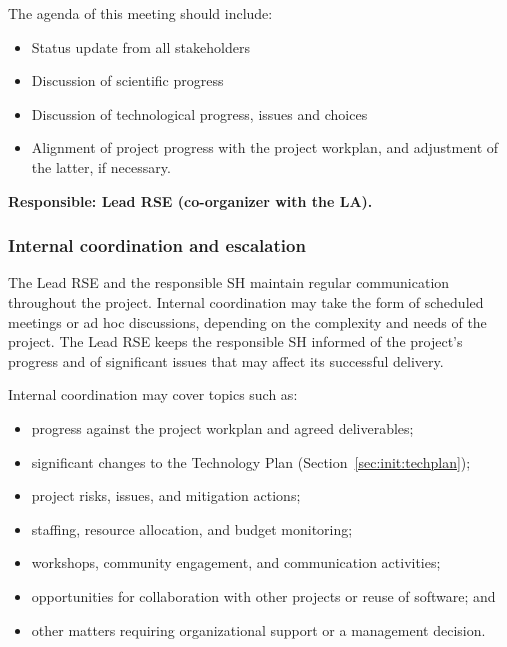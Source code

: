 The agenda of this meeting should include:
\vspace{-0.2cm}
\begin{itemize}
\item Status update from all stakeholders
\item Discussion of scientific progress
\item Discussion of technological progress, issues and choices
\item Alignment of project progress with the project workplan, and adjustment of the latter, if necessary.
\end{itemize}
\vspace{-0.2cm}

\textbf{Responsible: Lead RSE (co-organizer with the LA).}

\subsubsection{Internal coordination and escalation}
\label{sec:exec:internalcoord}
The Lead RSE and the responsible SH maintain regular communication throughout the project. Internal coordination may 
take the form of scheduled meetings or ad hoc discussions, depending on the complexity and needs of the project. The 
Lead RSE keeps the responsible SH informed of the project’s progress and of significant issues that may affect its 
successful delivery.

Internal coordination may cover topics such as:
\vspace{-0.2cm}
\begin{itemize}
\item progress against the project workplan and agreed deliverables;
\item significant changes to the Technology Plan (Section~\ref{sec:init:techplan});
\item project risks, issues, and mitigation actions;
\item staffing, resource allocation, and budget monitoring;
\item workshops, community engagement, and communication activities;
\item opportunities for collaboration with other projects or reuse of software; and
\item other matters requiring organizational support or a management decision.
\end{itemize}
\vspace{-0.2cm}

